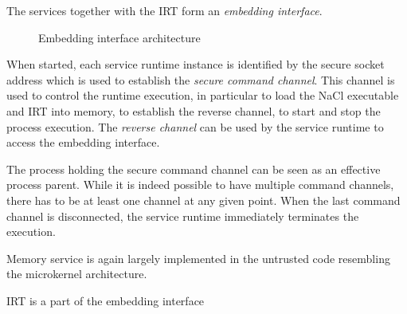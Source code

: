 The services together with the IRT form an \emph{embedding interface}.



\begin{figure}
\centering
\caption{Embedding interface architecture}
\label{fig:architecture}
\end{figure}

When started, each service runtime instance is identified by the
secure socket address which is used to establish the \emph{secure
command channel}. This channel is used to control the runtime execution,
in particular to load the NaCl executable and IRT into memory, to
establish the reverse channel, to start and stop the process execution.
The \emph{reverse channel} can be used by the service runtime to access
the embedding interface.

The process holding the secure command channel can be seen as an
effective process parent. While it is indeed possible to have multiple
command channels, there has to be at least one channel at any given
point.  When the last command channel is disconnected, the service
runtime immediately terminates the execution.


Memory service is again largely implemented in the untrusted code
resembling the microkernel architecture.

IRT is a part of the embedding interface



